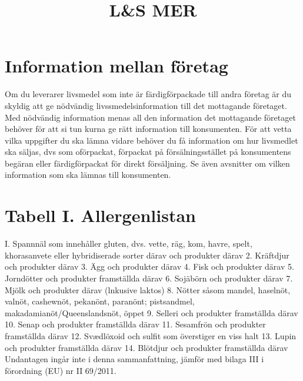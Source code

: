 \section*{Information mellan företag}
Om du leverarer livsmedel som inte är färdigförpackade till andra företag är du skyldig att ge nödvändig livssmedelsinformation till det mottagande företaget. Med nödvändig information menas all den information det mottagande företaget behöver för att si tun kurna ge rätt information till konsumenten. För att vetta vilka uppgifter du ska lämna vidare behöver du få information om hur livsmedlet ska säljas, dvs som oförpackat, förpackat på försälningsstället på konsumentens begäran eller färdigförpackat för direkt försäljning.
Se även avsnitter om vilken information som ska lämnas till konsumenten.
\section*{Tabell I. Allergenlistan}
I. Spannnäl som innehåller gluten, dvs. vette, räg, kom, havre, spelt, khorasanvete eller hybridiserade sorter därav och produkter därav
2. Kräftdjur och produkter därav
3. Ägg och produkter därav
4. Fisk och produkter därav
5. Jorndötter och produkter framställda därav
6. Sojäbörn och produkter därav
7. Mjölk och produkter därav (lnkusive laktos)
8. Nötter såsom mandel, haselnöt, valnöt, cashewnöt, pekanönt, paranönt; pistsandmel, makadamianöt/Queenslandsnöt, öppet
9. Selleri och produkter framställda därav
10. Senap och produkter framställda därav
11. Sesamfrön och produkter framställda därav
12. Svædlöxoid och sulfit som överstiger en viss halt
13. Lupin och produkter framställda därav
14. Blötdjur och produkter framställda därav
Undantagen ingår inte i denna sammanfattning, jämför med bilaga
III i förordning (EU) nr II 69/2011.

\title{
L\&S MER
}

